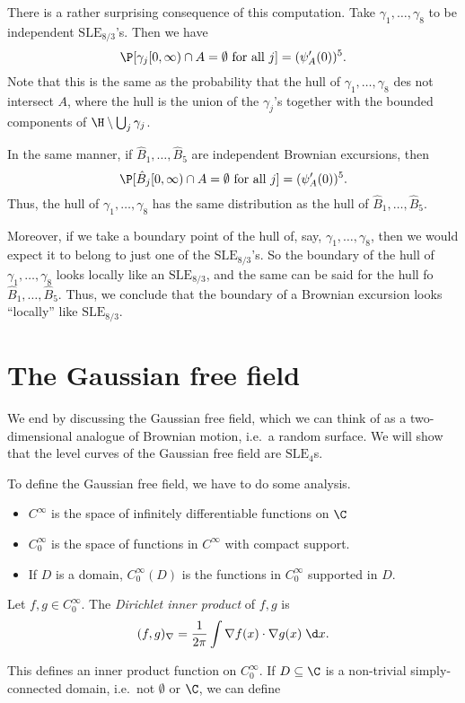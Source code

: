 \documentclass[a4paper]{article}
\newcommand\SLE{\mathrm{SLE}}
\begin{document}
There is a rather surprising consequence of this computation. Take $\gamma_1, \ldots, \gamma_8$ to be independent $\SLE_{8/3}$'s. Then we have
\[
  \P[\gamma_j[0, \infty) \cap A = \emptyset\text{ for all }j] = (\psi_A'(0))^5.
\]
Note that this is the same as the probability that the hull of $\gamma_1, \ldots, \gamma_8$ des not intersect $A$, where the hull is the union of the $\gamma_j$'s together with the bounded components of $\H \setminus \bigcup_j \gamma_j$.

In the same manner, if $\hat{B}_1, \ldots, \hat{B}_5$ are independent Brownian excursions, then
\[
  \P[\hat{B}_j[0, \infty) \cap A = \emptyset\text{ for all }j] = (\psi_A'(0))^5.
\]
Thus, the hull of $\gamma_1, \ldots, \gamma_8$ has the same distribution as the hull of $\hat{B}_1, \ldots, \hat{B}_5$.

Moreover, if we take a boundary point of the hull of, say, $\gamma_1, \ldots, \gamma_8$, then we would expect it to belong to just one of the $\SLE_{8/3}$'s. So the boundary of the hull of $\gamma_1, \ldots, \gamma_8$ looks locally like an $\SLE_{8/3}$, and the same can be said for the hull fo $\hat{B}_1, \ldots, \hat{B}_5$. Thus, we conclude that the boundary of a Brownian excursion looks ``locally'' like $\SLE_{8/3}$.

\section{The Gaussian free field}\label{sec:gff}
We end by discussing the Gaussian free field, which we can think of as a two-dimensional analogue of Brownian motion, i.e.\ a random surface. We will show that the level curves of the Gaussian free field are $\SLE_4$s.

To define the Gaussian free field, we have to do some analysis.
\begin{notation}\leavevmode
  \begin{itemize}
    \item $C^\infty$ is the space of infinitely differentiable functions on $\C$
    \item $C_0^\infty$ is the space of functions in $C^\infty$ with compact support.
    \item If $D$ is a domain, $C_0^\infty(D)$ is the functions in $C_0^\infty$ supported in $D$.
  \end{itemize}
\end{notation}

\begin{defi}
  Let $f, g \in C_0^\infty$. The \emph{Dirichlet inner product} of $f, g$ is
  \[
    (f, g)_\nabla = \frac{1}{2\pi}\int \nabla f(x) \cdot \nabla g(x)\;\d x.
  \]
\end{defi}
This defines an inner product function on $C_0^\infty$. If $D \subseteq \C$ is a non-trivial simply-connected domain, i.e.\ not $\emptyset$ or $\C$, we can define
\end{document}
